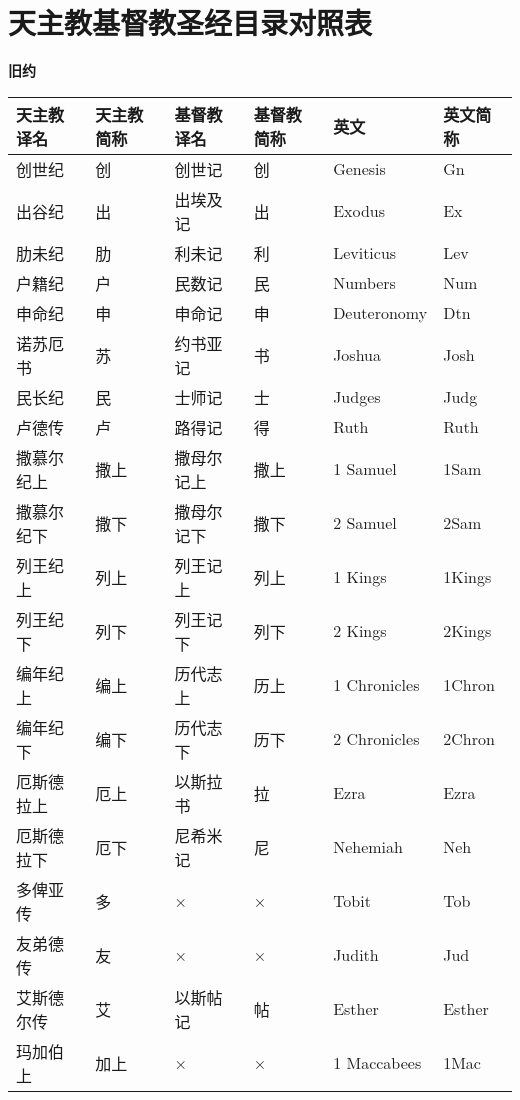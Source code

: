 \chapter{天主教基督教圣经目录对照表}

\begin{center}
	\textbf{旧约}
\end{center}

\begin{longtable}{|l|l|l|l|l|l|}
	\hline 
	\textbf{天主教译名} & \textbf{天主教简称} & \textbf{基督教译名} & \textbf{基督教简称} & \textbf{英文} & \textbf{英文简称} \\ 
	\hline 
	创世纪 & 创 & 创世记 & 创 & Genesis & Gn \\
	\hline
	出谷纪 & 出 & 出埃及记 & 出 & Exodus & Ex \\
	\hline
	肋未纪 & 肋 & 利未记 & 利 & Leviticus & Lev \\
	\hline
	户籍纪 & 户 & 民数记 & 民 & Numbers & Num \\
	\hline
	申命纪 & 申 & 申命记 & 申 & Deuteronomy & Dtn \\
	\hline
	诺苏厄书 & 苏 & 约书亚记 & 书 & Joshua & Josh \\
	\hline
	民长纪 & 民 & 士师记 & 士 & Judges & Judg \\
	\hline
	卢德传 & 卢 & 路得记 & 得 & Ruth & Ruth \\
	\hline
	撒慕尔纪上 & 撒上 & 撒母尔记上 & 撒上 & 1 Samuel & 1Sam \\
	\hline
	撒慕尔纪下 & 撒下 & 撒母尔记下 & 撒下 & 2 Samuel & 2Sam \\
	\hline
	列王纪上 & 列上 & 列王记上 & 列上 & 1 Kings & 1Kings \\
	\hline
	列王纪下 & 列下 & 列王记下 & 列下 & 2 Kings & 2Kings \\
	\hline
	编年纪上 & 编上 & 历代志上 & 历上 & 1 Chronicles & 1Chron \\
	\hline
	编年纪下 & 编下 & 历代志下 & 历下 & 2 Chronicles & 2Chron \\
	\hline
	厄斯德拉上 & 厄上 & 以斯拉书 & 拉 & Ezra & Ezra \\
	\hline
	厄斯德拉下 & 厄下 & 尼希米记 & 尼 & Nehemiah & Neh \\
	\hline
	多俾亚传 & 多 & × & × & Tobit & Tob \\
	\hline
	友弟德传 & 友 & × & × & Judith & Jud \\
	\hline
	艾斯德尔传 & 艾 & 以斯帖记 & 帖 & Esther & Esther \\
	\hline
	玛加伯上 & 加上 & × & × & 1 Maccabees & 1Mac \\

\end{longtable}
